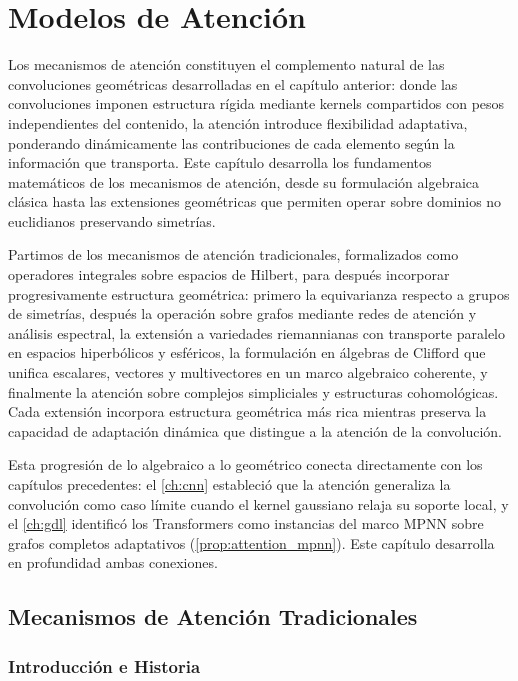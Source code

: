 \chapter{Modelos de Atención}\label{ch:attention}

Los mecanismos de atención constituyen el complemento natural de las convoluciones geométricas desarrolladas en el capítulo anterior: donde las convoluciones imponen estructura rígida mediante kernels compartidos con pesos independientes del contenido, la atención introduce flexibilidad adaptativa, ponderando dinámicamente las contribuciones de cada elemento según la información que transporta. Este capítulo desarrolla los fundamentos matemáticos de los mecanismos de atención, desde su formulación algebraica clásica hasta las extensiones geométricas que permiten operar sobre dominios no euclidianos preservando simetrías.

Partimos de los mecanismos de atención tradicionales, formalizados como operadores integrales sobre espacios de Hilbert, para después incorporar progresivamente estructura geométrica: primero la equivarianza respecto a grupos de simetrías, después la operación sobre grafos mediante redes de atención y análisis espectral, la extensión a variedades riemannianas con transporte paralelo en espacios hiperbólicos y esféricos, la formulación en álgebras de Clifford que unifica escalares, vectores y multivectores en un marco algebraico coherente, y finalmente la atención sobre complejos simpliciales y estructuras cohomológicas. Cada extensión incorpora estructura geométrica más rica mientras preserva la capacidad de adaptación dinámica que distingue a la atención de la convolución.

Esta progresión de lo algebraico a lo geométrico conecta directamente con los capítulos precedentes: el \autoref{ch:cnn} estableció que la atención generaliza la convolución como caso límite cuando el kernel gaussiano relaja su soporte local, y el \autoref{ch:gdl} identificó los \glspl{Transformer} como instancias del marco \gls{MPNN} sobre grafos completos adaptativos (\autoref{prop:attention_mpnn}). Este capítulo desarrolla en profundidad ambas conexiones.

\section{Mecanismos de Atención Tradicionales}\label{sec:atencion_tradicional}

\subsection{Introducción e Historia}\label{subsec:historia_atencion}

